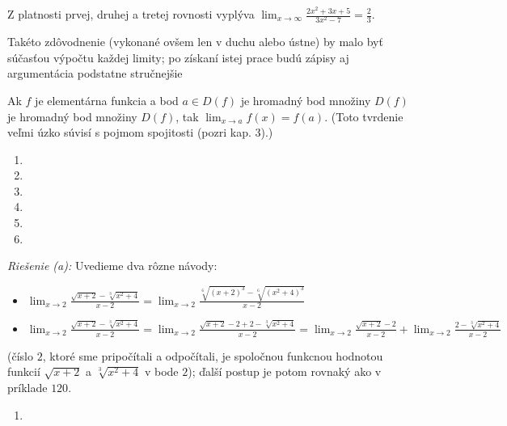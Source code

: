 Z platnosti prvej, druhej a tretej rovnosti vyplýva $\lim_{x \rightarrow \infty}
\frac{2x^2 + 3x + 5}{3x^2 - 7} = \frac{2}{3}$.

Takéto zdôvodnenie (vykonané ovšem len v duchu alebo ústne) by malo byť súčasťou
výpočtu každej limity; po získaní istej prace budú zápisy aj argumentácia
podstatne stručnejšie

\begin{veta}
Ak $f$ je elementárna funkcia a bod $a \in D(f)$ je hromadný bod množiny $D(f)$
je hromadný bod množiny $D(f)$, tak $\lim_{x \rightarrow a} f(x) = f(a)$. (Toto
tvrdenie veľmi úzko súvisí s pojmom spojitosti (pozri kap. 3).)
\end{veta}

\begin{enumerate}[resume]
  \item {}
  \item {}
  \item {}
  \item {}
  \item {}
  \item {}
\end{enumerate}

\textit{Riešenie (a):}
Uvedieme dva rôzne návody:
\begin{itemize}
\item $\lim_{x \rightarrow 2} \frac{\sqrt{x+2}-\sqrt[3]{x^2+4}}{x-2}=\lim_{x \rightarrow 2} \frac{\sqrt[6]{(x+2)^3}-\sqrt[6]{(x^2+4)^3}}{x-2}$
\item $\lim_{x \rightarrow 2} \frac{\sqrt{x+2}-\sqrt[3]{x^2+4}}{x-2}=\lim_{x \rightarrow 2} \frac{\sqrt{x+2}-2+2-\sqrt[3]{x^2+4}}{x-2}=\lim_{x \rightarrow 2} \frac{\sqrt{x+2}-2}{x-2}+\lim_{x \rightarrow 2} \frac{2-\sqrt[3]{x^2+4}}{x-2}$
\end{itemize}

(číslo $2$, ktoré sme pripočítali a odpočítali, je spoločnou funkcnou hodnotou funkcií $\sqrt{x+2}$ a $\sqrt[3]{x^2+4}$ v bode $2$); ďalší postup je potom rovnaký ako v príklade $120$.

\begin{enumerate}[resume]
  \item {}
\end{enumerate}

